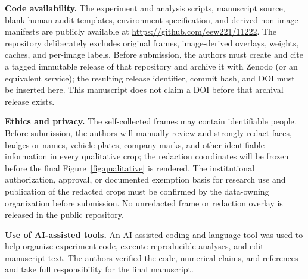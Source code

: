 \documentclass[iicol,pdflatex,sn-mathphys-num]{sn-jnl}
\begin{document}
\textbf{Code availability.} The experiment and analysis scripts, manuscript source, blank human-audit templates, environment specification, and derived non-image manifests are publicly available at \url{https://github.com/eew221/11222}. The repository deliberately excludes original frames, image-derived overlays, weights, caches, and per-image labels. Before submission, the authors must create and cite a tagged immutable release of that repository and archive it with Zenodo (or an equivalent service); the resulting release identifier, commit hash, and DOI must be inserted here. This manuscript does not claim a DOI before that archival release exists.

\textbf{Ethics and privacy.} The self-collected frames may contain identifiable people. Before submission, the authors will manually review and strongly redact faces, badges or names, vehicle plates, company marks, and other identifiable information in every qualitative crop; the redaction coordinates will be frozen before the final Figure~\ref{fig:qualitative} is rendered. The institutional authorization, approval, or documented exemption basis for research use and publication of the redacted crops must be confirmed by the data-owning organization before submission. No unredacted frame or redaction overlay is released in the public repository.

\textbf{Use of AI-assisted tools.} An AI-assisted coding and language tool was used to help organize experiment code, execute reproducible analyses, and edit manuscript text. The authors verified the code, numerical claims, and references and take full responsibility for the final manuscript.


\end{document}
